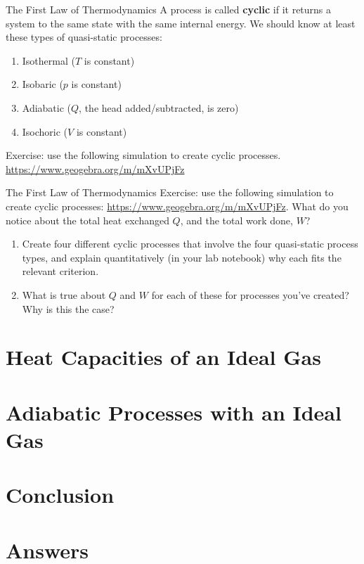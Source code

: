 \documentclass{beamer}
\begin{document}
\begin{frame}{The First Law of Thermodynamics}
A process is called \textbf{cyclic} if it returns a system to the same state with the same internal energy.
We should know at least these types of quasi-static processes: \small 
\begin{enumerate}
\item Isothermal ($T$ is constant)
\item Isobaric ($p$ is constant)
\item Adiabatic ($Q$, the head added/subtracted, is zero)
\item Isochoric ($V$ is constant)
\end{enumerate}
Exercise: use the following simulation to create cyclic processes.
\url{https://www.geogebra.org/m/mXvUPjFz}
\end{frame}

\begin{frame}{The First Law of Thermodynamics}
Exercise: use the following simulation to create cyclic processes: \url{https://www.geogebra.org/m/mXvUPjFz}.  What do you notice about the total heat exchanged $Q$, and the total work done, $W$?
\begin{enumerate}
\item Create four different cyclic processes that involve the four quasi-static process types, and explain quantitatively (in your lab notebook) why each fits the relevant criterion.
\item What is true about $Q$ and $W$ for each of these for processes you've created?  Why is this the case?
\end{enumerate}
\end{frame}

\section{Heat Capacities of an Ideal Gas}

\section{Adiabatic Processes with an Ideal Gas}

\section{Conclusion}

\section{Answers}
\end{document}
